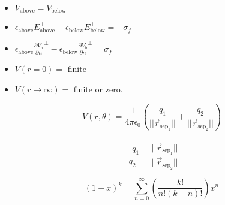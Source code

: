 \documentclass{article}
\newcommand{\kfrac}{\frac{1}{4\pi\epsilon_0}}
\newcommand{\formula}[2]{\begin{center} \begin{tcolorbox}[title = #1, boxrule=2pt,arc=3.4pt,boxsep=0mm] $$#2$$\end{tcolorbox}\end{center}}
\newcommand{\doubleformula}[3]{\begin{center} \begin{tcolorbox}[title = #1, boxrule=2pt,arc=3.4pt,boxsep=0mm] $$#2$$\\$$#3$$\end{tcolorbox}\end{center}}
\begin{document}
\begin{multicols}{2}
{\begin{itemize}
                \item $V_\textrm{above} = V_\textrm{below}$
                \item $\epsilon_\textrm{above}E_\textrm{above}^\perp - \epsilon_\textrm{below}E_\textrm{below}^\perp = -\sigma_f$
                \item $\epsilon_\textrm{above}\frac{\partial V_a}{\partial n}^\perp - \epsilon_\textrm{below}\frac{\partial V_b}{\partial n}^\perp = \sigma_f$
                \item $V(r = 0) = $ finite
                \item $V(r \to \infty) = $ finite or zero.
            \end{itemize}
        }
        \doubleformula{Method of Images Voltage}{V (r, \theta) = \kfrac\left(\frac{q_1}{||\vec{r}_{\textrm{sep}_1}||} + \frac{q_2}{||\vec{r}_{\textrm{sep}_2}||}\right)}{\frac{-q_1}{q_2} = \frac{||\vec{r}_{\textrm{sep}_1}||}{||\vec{r}_{\textrm{sep}_2}||}}
        \begin{multicols}{2}
            \formula{Binomial Expansion}{(1 + x)^k = \sum_{n = 0}^\infty{\left(\frac{k!}{n!(k - n)!}\right)}x^n}
        \end{multicols}
    \end{multicols}
\end{document}
